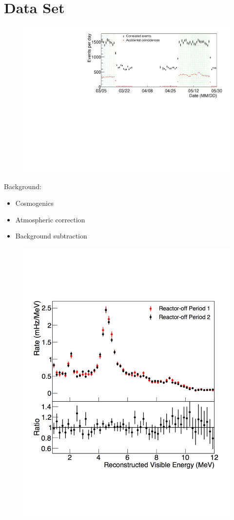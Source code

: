 \section{Data Set}
\begin{figure}[H]
	\centering
	\includegraphics[width=0.7\linewidth]{tex/7-oscillation-images/EvtRates}
	\caption{}
	\label{fig:evtrates}
\end{figure}



\noindent Background:
\begin{itemize}
	\item Cosmogenics
	\item Atmospheric correction
	\item Background subtraction
\end{itemize}

\begin{figure}[H]
	\centering
	\includegraphics[width=0.7\linewidth]{tex/7-oscillation-images/RxOffSpectrum}
	\caption{}
	\label{fig:rxoffspectrum}
\end{figure}



